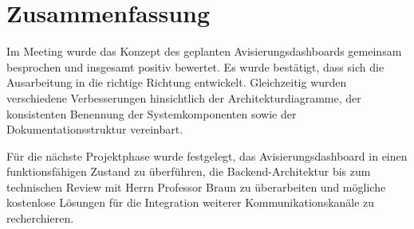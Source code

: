\documentclass[a4paper,11pt]{article}
\begin{document}
\vspace{1cm}

\section{Zusammenfassung}

Im Meeting wurde das Konzept des geplanten Avisierungsdashboards gemeinsam besprochen und insgesamt positiv bewertet. Es wurde bestätigt, dass sich die Ausarbeitung in die richtige Richtung entwickelt. Gleichzeitig wurden verschiedene Verbesserungen hinsichtlich der Architekturdiagramme, der konsistenten Benennung der Systemkomponenten sowie der Dokumentationsstruktur vereinbart.

Für die nächste Projektphase wurde festgelegt, das Avisierungsdashboard in einen funktionsfähigen Zustand zu überführen, die Backend-Architektur bis zum technischen Review mit Herrn Professor Braun zu überarbeiten und mögliche kostenlose Lösungen für die Integration weiterer Kommunikationskanäle zu recherchieren.
\end{document}
